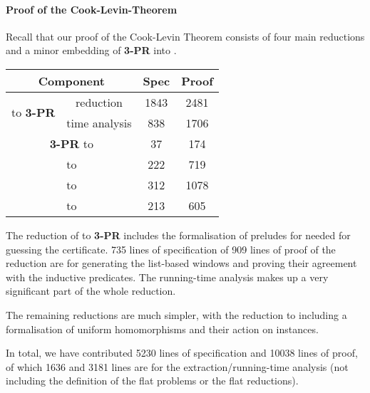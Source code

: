 \paragraph{Proof of the Cook-Levin-Theorem}
Recall that our proof of the Cook-Levin Theorem consists of four main reductions and a minor embedding of \textbf{3-PR} into \PR{}.

\begin{center}
  \begin{tabular}{cccc}
    \multicolumn{2}{c}{Component} & Spec & Proof \\
    \midrule
    \multirow{2}{*}{\gennp{} to \textbf{3-PR}} & reduction & 1843 & 2481 \\ %
                                               & time analysis & 838 & 1706 \\
    \multicolumn{2}{c}{\textbf{3-PR} to \PR{}} & 37 & 174 \\ 
    \multicolumn{2}{c}{\PR{} to \BPR{}} & 222 & 719 \\%
    \multicolumn{2}{c}{\BPR{} to \fsat{}} & 312 & 1078 \\
    \multicolumn{2}{c}{\fsat{} to \SAT{}} & 213 & 605 
  \end{tabular}
\end{center}

The reduction of \gennp{} to \textbf{3-PR} includes the formalisation of preludes for \PR{} needed for guessing the certificate. 735 lines of specification of 909 lines of proof of the reduction are for generating the list-based windows and proving their agreement with the inductive predicates. 
The running-time analysis makes up a very significant part of the whole reduction. 

The remaining reductions are much simpler, with the reduction to \BPR{} including a formalisation of uniform homomorphisms and their action on \PR{} instances.

In total, we have contributed 5230 lines of specification and 10038 lines of proof, of which 1636 and 3181 lines are for the extraction/running-time analysis (not including the definition of the flat problems or the flat reductions). 

